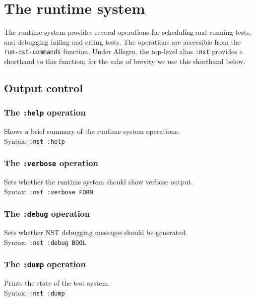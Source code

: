 \section{The runtime system}

The runtime system provides several operations for scheduling and
running tests, and debugging failing and erring tests.  The operations
are accessible from the
\texttt{run-nst-commands}
function.  Under Allegro, the top-level alias
\texttt{:nst} provides a shorthand to this
function; for the sake of brevity we use this shorthand below.

\subsection{Output control}
\subsubsection{The \texttt{:help} operation}
%
Shows a brief summary of the runtime system operations.
\\ Syntax: \texttt{:nst :help}

\subsubsection{The \texttt{:verbose} operation}
%
Sets whether the runtime system should show verbose output.
\\ Syntax: \texttt{:nst :verbose FORM}

\subsubsection{The \texttt{:debug} operation}
%
Sets whether NST debugging messages should be generated.
\\ Syntax: \texttt{:nst :debug BOOL}

\subsubsection{The \texttt{:dump} operation}
%
Prints the state of the test system.
\\ Syntax: \texttt{:nst :dump}

